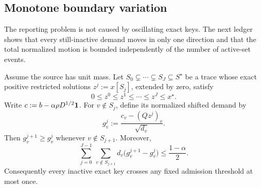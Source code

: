 \subsection{Monotone boundary variation}
\label{sec:boundary-variation}

The reporting problem is not caused by oscillating exact keys.  The next
ledger shows that every still-inactive demand moves in only one direction and
that the total normalized motion is bounded independently of the number of
active-set events.

\begin{lemma}
\label{lem:boundary-variation}
Assume the source has unit mass.  Let
$S_0\subsetneq\cdots\subsetneq S_J\subseteq S^\star$ be a trace whose exact
positive restricted solutions $z^j:=x[S_j]$, extended by zero, satisfy
\begin{equation}
 0\leq z^0\leq z^1\leq\cdots\leq z^J\leq x^\star.
 \label{eq:monotone-face-trace}
\end{equation}
Write $c:=b-\alpha\rho D^{1/2}\mathbf{1}$.  For $v\notin S_j$, define its
normalized shifted demand by
\begin{equation}
 g_v^j:=\frac{c_v-(Qz^j)_v}{\sqrt{d_v}}.
 \label{eq:normalized-boundary-demand}
\end{equation}
Then $g_v^{j+1}\geq g_v^j$ whenever $v\notin S_{j+1}$.  Moreover,
\begin{equation}
 \sum_{j=0}^{J-1}\ \sum_{v\notin S_{j+1}}
 d_v\bigl(g_v^{j+1}-g_v^j\bigr)
 \leq\frac{1-\alpha}{2}.
 \label{eq:boundary-total-variation}
\end{equation}
Consequently every inactive exact key crosses any fixed admission threshold
at most once.
\end{lemma}

